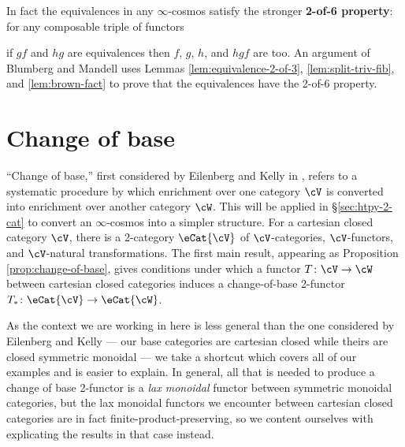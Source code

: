 \begin{rmk}\label{rmk:2-of-6}
In fact the equivalences in any $\infty$-cosmos satisfy the stronger \textbf{2-of-6 property}: for any composable triple of functors
\begin{center}
\end{center}
if $gf$ and $hg$ are equivalences then $f$, $g$, $h$, and $hgf$ are too. An argument of Blumberg and Mandell \cite[6.4]{BlumbergMandell:2011ak} uses Lemmas \ref{lem:equivalence-2-of-3}, \ref{lem:split-triv-fib}, and \ref{lem:brown-fact} to prove that the equivalences have the 2-of-6 property.
\end{rmk}



\section{Change of base}\label{sec:change-of-base}

``Change of base,'' first considered by Eilenberg and Kelly in \cite{EilenbergKelly:1966cc}, refers to a systematic procedure by which enrichment over one category $\cV$ is converted into enrichment over another category $\cW$.  This will be applied in \S\ref{sec:htpy-2-cat} to convert an $\infty$-cosmos into a simpler structure.
For a cartesian closed category $\cV$, there is a 2-category $\eCat{\cV}$ of $\cV$-categories, $\cV$-functors, and $\cV$-natural transformations. The first main result, appearing as Proposition \ref{prop:change-of-base}, gives conditions under which a functor $T \colon \cV \to \cW$ between cartesian closed categories induces a change-of-base 2-functor $T_* \colon \eCat{\cV} \to \eCat{\cW}$.

As the context we are working in here is less general than the one considered by Eilenberg and Kelly --- our base categories are cartesian closed while theirs are closed symmetric monoidal --- we take a shortcut which covers all of our examples and is easier to explain.  In general, all that is needed to produce a change of base 2-functor is a \emph{lax monoidal} functor between symmetric monoidal categories, but the lax monoidal functors we encounter between cartesian closed categories are in fact finite-product-preserving, so we content ourselves with explicating the results in that case instead.

